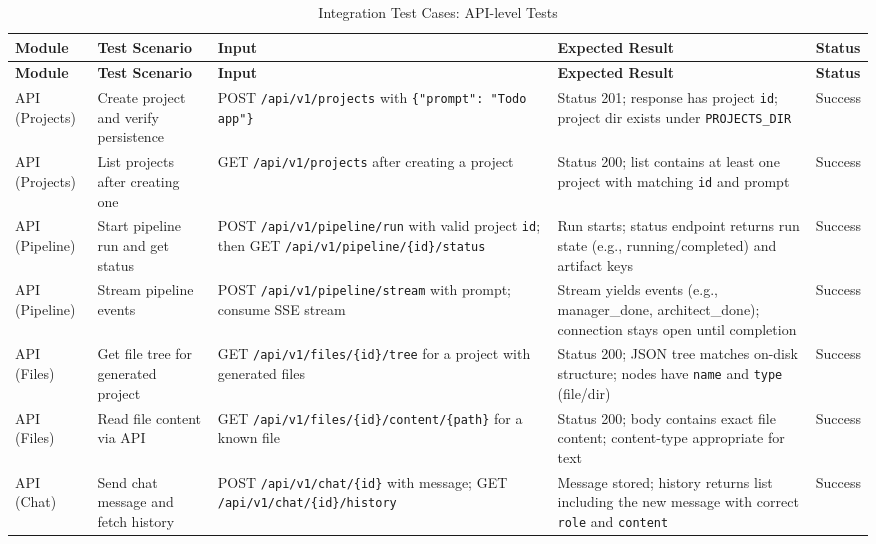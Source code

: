\renewcommand{\arraystretch}{1.2}
\begin{longtable}{|p{2.8cm}|p{3.4cm}|p{3.4cm}|p{4.2cm}|>{\centering\arraybackslash}p{1.6cm}|}
\caption{Integration Test Cases: API-level Tests}
\label{tab:integration_api}
\\
\hline
\textbf{Module} & \textbf{Test Scenario} & \textbf{Input} & \textbf{Expected Result} & \textbf{Status} \\
\hline
\endfirsthead
\hline
\textbf{Module} & \textbf{Test Scenario} & \textbf{Input} & \textbf{Expected Result} & \textbf{Status} \\
\hline
\endhead
\hline
\endfoot
\hline
\endlastfoot
API (Projects) & Create project and verify persistence & POST \texttt{/\allowbreak{}api/\allowbreak{}v1/\allowbreak{}projects} with \texttt{\{"prompt": "Todo app"\}} & Status 201; response has project \texttt{id}; project dir exists under \texttt{PROJECTS\_\allowbreak{}DIR} & Success \\
\hline
API (Projects) & List projects after creating one & GET \texttt{/\allowbreak{}api/\allowbreak{}v1/\allowbreak{}projects} after creating a project & Status 200; list contains at least one project with matching \texttt{id} and prompt & Success \\
\hline
API (Pipeline) & Start pipeline run and get status & POST \texttt{/\allowbreak{}api/\allowbreak{}v1/\allowbreak{}pipeline/\allowbreak{}run} with valid project \texttt{id}; then GET \texttt{/\allowbreak{}api/\allowbreak{}v1/\allowbreak{}pipeline/\allowbreak{}\{id\}/status} & Run starts; status endpoint returns run state (e.g., running/completed) and artifact keys & Success \\
\hline
API (Pipeline) & Stream pipeline events & POST \texttt{/\allowbreak{}api/\allowbreak{}v1/\allowbreak{}pipeline/\allowbreak{}stream} with prompt; consume SSE stream & Stream yields events (e.g., manager\_done, architect\_done); connection stays open until completion & Success \\
\hline
API (Files) & Get file tree for generated project & GET \texttt{/\allowbreak{}api/\allowbreak{}v1/\allowbreak{}files/\allowbreak{}\{id\}/tree} for a project with generated files & Status 200; JSON tree matches on-disk structure; nodes have \texttt{name} and \texttt{type} (file/dir) & Success \\
\hline
API (Files) & Read file content via API & GET \texttt{/\allowbreak{}api/\allowbreak{}v1/\allowbreak{}files/\allowbreak{}\{id\}/content/\{path\}} for a known file & Status 200; body contains exact file content; content-type appropriate for text & Success \\
\hline
API (Chat) & Send chat message and fetch history & POST \texttt{/\allowbreak{}api/\allowbreak{}v1/\allowbreak{}chat/\allowbreak{}\{id\}} with message; GET \texttt{/\allowbreak{}api/\allowbreak{}v1/\allowbreak{}chat/\allowbreak{}\{id\}/history} & Message stored; history returns list including the new message with correct \texttt{role} and \texttt{content} & Success \\
\hline
\end{longtable}

